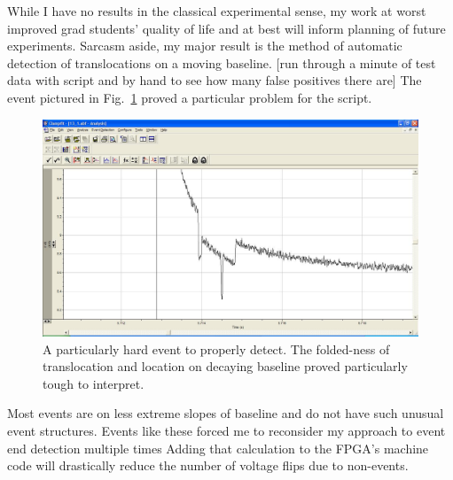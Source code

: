 \documentclass[aps,prl,preprint,groupedaddress]{revtex4}
\begin{document}
While I have no results in the classical experimental sense, my work at worst improved grad students' quality of life and at best will inform planning of future experiments.
Sarcasm aside, my major result is the method of automatic detection of translocations on a moving baseline.
[run through a minute of test data with script and by hand to see how many false positives there are]
The event pictured in Fig.~\ref{fig:tough-event} proved a particular problem for the script.
\begin{figure}
\centering
\includegraphics[width=1\textwidth]{figures/tough-event}
\caption{A particularly hard event to properly detect.
The folded-ness of translocation and location on decaying baseline proved particularly tough to interpret.}
\label{fig:tough-event}
\end{figure}
Most events are on less extreme slopes of baseline and do not have such unusual event structures.
Events like these forced me to reconsider my approach to event end detection multiple times
Adding that calculation to the FPGA's machine code will drastically reduce the number of voltage flips due to non-events.
\end{document}
